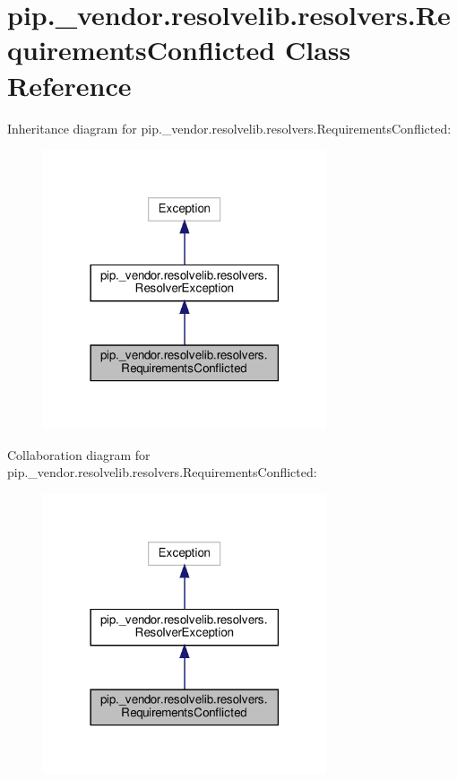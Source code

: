 \hypertarget{classpip_1_1__vendor_1_1resolvelib_1_1resolvers_1_1RequirementsConflicted}{}\section{pip.\+\_\+vendor.\+resolvelib.\+resolvers.\+Requirements\+Conflicted Class Reference}
\label{classpip_1_1__vendor_1_1resolvelib_1_1resolvers_1_1RequirementsConflicted}


Inheritance diagram for pip.\+\_\+vendor.\+resolvelib.\+resolvers.\+Requirements\+Conflicted\+:
\nopagebreak
\begin{figure}[H]
\begin{center}
\leavevmode
\includegraphics[width=237pt]{classpip_1_1__vendor_1_1resolvelib_1_1resolvers_1_1RequirementsConflicted__inherit__graph}
\end{center}
\end{figure}


Collaboration diagram for pip.\+\_\+vendor.\+resolvelib.\+resolvers.\+Requirements\+Conflicted\+:
\nopagebreak
\begin{figure}[H]
\begin{center}
\leavevmode
\includegraphics[width=237pt]{classpip_1_1__vendor_1_1resolvelib_1_1resolvers_1_1RequirementsConflicted__coll__graph}
\end{center}
\end{figure}
